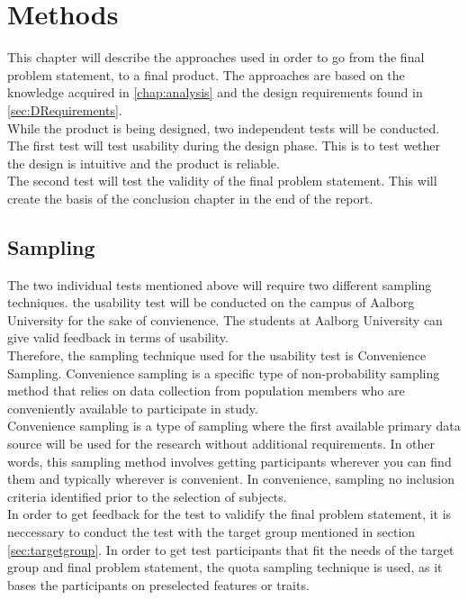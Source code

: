 \chapter{Methods}\label{chap:methods}
This chapter will describe the approaches used in order to go from the final problem statement, to a final product. The approaches are based on the knowledge acquired in \autoref{chap:analysis} and the design requirements found in \autoref{sec:DRequirements}.\\

While the product is being designed, two independent tests will be conducted. The first test will test usability during the design phase. This is to test wether the design is intuitive and the product is reliable.\\

The second test will test the validity of the final problem statement. This will create the basis of the conclusion chapter in the end of the report.\\

\section{Sampling}
The two individual tests mentioned above will require two different sampling techniques.
the usability test will be conducted on the campus of Aalborg University for the sake of convienence. The students at Aalborg University can give valid feedback in terms of usability.\\

Therefore, the sampling technique used for the usability test is Convenience Sampling. Convenience sampling is a specific type of non-probability sampling method that relies on data collection from population members who are conveniently available to participate in study. \cite{convSamp}\\
Convenience sampling is a type of sampling where the first available primary data source will be used for the research without additional requirements. In other words, this sampling method involves getting participants wherever you can find them and typically wherever is convenient.\cite{convSamp} In convenience, sampling no inclusion criteria identified prior to the selection of subjects. \cite{convSamp}\\

In order to get feedback for the test to validify the final problem statement, it is neccessary to conduct the test with the target group mentioned in section \autoref{sec:targetgroup}. In order to get test participants that fit the needs of the target group and final problem statement, the quota sampling technique is used, as it bases the participants on preselected features or traits.\\

